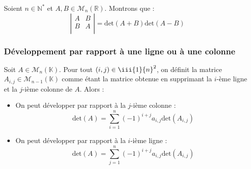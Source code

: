 \documentclass[french,11pt,twoside]{VcCours}
\begin{document}
\begin{Exemple} Soient $n \in \mathbb{N}^*$ et $A, B \in \mathcal{M}_n(\mathbb{R})$. Montrons que :
$$ \left\vert \begin{array}{cc}
A & B \\
B & A \\
\end{array}\right\vert= \textrm{det}(A+B) \textrm{det}(A-B)$$

\medskip

\vspace{8.5cm}
%
\end{Exemple}

\subsubsection{Développement par rapport à une ligne ou à une colonne}


\begin{Proposition}{} Soit $A \in \mathcal{M}_n(\mathbb{K})$. Pour tout $(i,j) \in  \iii{1}{n}^2$, on définit la matrice $A_{i,j} \in  \mathcal{M}_{n-1}(\mathbb{K})$ comme étant la matrice obtenue en supprimant la $i$-ème ligne et la $j$-ième colonne de $A$. Alors :

\begin{itemize}
\item On peut développer par rapport à la $j$-ième colonne :
$$ \textrm{det}(A) = \sum_{i=1}^n (-1)^{i+j} a_{i,j} \textrm{det}(A_{i,j}) $$
\item On peut développer par rapport à la $i$-ième ligne :
$$ \textrm{det}(A) = \sum_{j=1}^n (-1)^{i+j} a_{i,j} \textrm{det}(A_{i,j}) $$
\end{itemize}
\end{Proposition}
\end{document}
